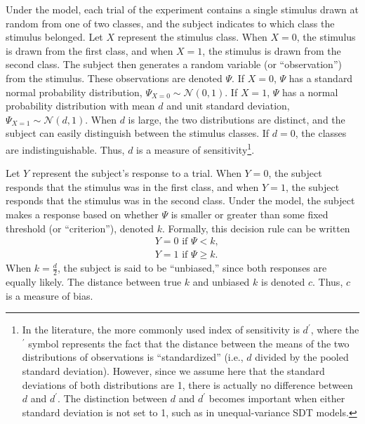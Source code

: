 \documentclass[man]{apa6}
\begin{document}
Under the model, each trial of the experiment contains a single stimulus drawn at random from one of two classes, and the subject indicates to which class the stimulus belonged. Let $X$ represent the stimulus class. When $X=0$, the stimulus is drawn from the first class, and when $X=1$, the stimulus is drawn from the second class. The subject then generates a random variable (or ``observation'') from the stimulus. These observations are denoted $\Psi$. If $X=0$, $\Psi$ has a standard normal probability distribution, $\Psi_{X=0}\sim{}\mathcal{N}\left(0,1\right)$. If $X=1$, $\Psi$ has a normal probability distribution with mean $d$ and unit standard deviation,
$\Psi_{X=1}\sim{}\mathcal{N}\left(d,1\right)$. When $d$ is large, the two distributions are distinct, and the subject can easily distinguish between the stimulus classes. If $d=0$, the classes are indistinguishable. Thus, $d$ is a measure of sensitivity\footnote{In the literature, the more commonly used index of sensitivity is $d^\prime$, where the $^\prime$ symbol represents the fact that the distance between the means of the two distributions of observations is ``standardized''  (i.e., $d$ divided by the pooled standard deviation). However, since we assume here that the standard deviations of both distributions are 1, there is actually no difference between $d$ and $d^\prime$. The distinction between $d$ and $d^\prime$ becomes important when either standard deviation is not set to 1, such as in unequal-variance SDT models.}.

Let $Y$ represent the subject's response to a trial. When $Y=0$, the subject responds that the stimulus was in the first class, and when $Y=1$, the subject responds that the stimulus was in the second class. Under the model, the subject makes a response based on whether $\Psi$ is smaller or greater than some fixed threshold (or ``criterion''), denoted $k$. Formally, this decision rule can be written
\begin{eqnarray*}
&Y=0\textrm{ if }\Psi<k\textrm{,}\\
&Y=1\textrm{ if }\Psi\ge{}k\textrm{.}
\end{eqnarray*}When $k=\frac{d}{2}$, the subject is said to be ``unbiased,'' since both responses are equally likely. The distance between true $k$ and unbiased $k$ is denoted $c$. Thus, $c$ is a measure of bias.
\end{document}
